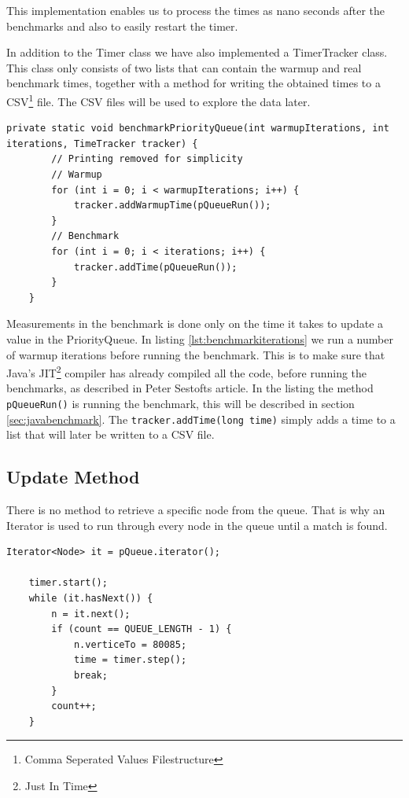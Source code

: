 \documentclass{article}
\begin{document}
This implementation enables us to process the times as nano seconds after 
the benchmarks and also to easily restart the timer.

In addition to the Timer class we have also implemented a TimerTracker class.
This class only consists of two lists that can contain the warmup and real 
benchmark times, together with a method for writing the obtained times to a CSV\footnote{Comma Seperated Values Filestructure} file.
The CSV files will be used to explore the data later. 

\begin{lstlisting}[caption={Benchmark iterations}, label={lst:benchmarkiterations}]
    private static void benchmarkPriorityQueue(int warmupIterations, int iterations, TimeTracker tracker) {
        // Printing removed for simplicity
        // Warmup
        for (int i = 0; i < warmupIterations; i++) {
            tracker.addWarmupTime(pQueueRun());
        }
        // Benchmark
        for (int i = 0; i < iterations; i++) {
            tracker.addTime(pQueueRun());
        }
    }
\end{lstlisting}

Measurements in the benchmark is done only on the time it takes to update 
a value in the PriorityQueue. In listing \ref{lst:benchmarkiterations} we run a number of warmup iterations before running the
benchmark. This is to make sure that Java's JIT\footnote{Just In Time} 
compiler has already compiled all the code, before running the benchmarks, as described in Peter Sestofts article\cite{microbenchmarks}. 
In the listing the method \lstinline{pQueueRun()} is running the benchmark, this will be described 
in section \ref{sec:javabenchmark}. The \lstinline{tracker.addTime(long time)} 
simply adds a time to a list that will later be written to a CSV file.


\subsection{Update Method} %
There is no method to retrieve a specific node from the queue.
That is why an Iterator is used to run through every node in the queue until a match is found.

\begin{lstlisting}[caption={Finding the node},label={lst:Finding_the_node}]
    Iterator<Node> it = pQueue.iterator();

    timer.start();
    while (it.hasNext()) {
        n = it.next();
        if (count == QUEUE_LENGTH - 1) {
            n.verticeTo = 80085;
            time = timer.step();
            break;
        }
        count++;
    }
\end{lstlisting}
\end{document}
